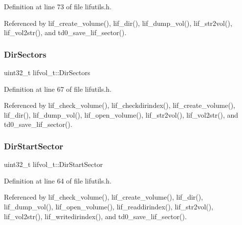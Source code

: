 Definition at line 73 of file lifutils.\+h.



Referenced by lif\+\_\+create\+\_\+volume(), lif\+\_\+dir(), lif\+\_\+dump\+\_\+vol(), lif\+\_\+str2vol(), lif\+\_\+vol2str(), and td0\+\_\+save\+\_\+lif\+\_\+sector().

\mbox{\label{structlifvol__t_aceac3bc67cda1f79d91c002411e33897}} 
\subsubsection{\texorpdfstring{Dir\+Sectors}{DirSectors}}
{\footnotesize\ttfamily uint32\+\_\+t lifvol\+\_\+t\+::\+Dir\+Sectors}



Definition at line 67 of file lifutils.\+h.



Referenced by lif\+\_\+check\+\_\+volume(), lif\+\_\+checkdirindex(), lif\+\_\+create\+\_\+volume(), lif\+\_\+dir(), lif\+\_\+dump\+\_\+vol(), lif\+\_\+open\+\_\+volume(), lif\+\_\+str2vol(), lif\+\_\+vol2str(), and td0\+\_\+save\+\_\+lif\+\_\+sector().

\mbox{\label{structlifvol__t_a89b86c990a7843cfa2addfff9a775137}} 
\subsubsection{\texorpdfstring{Dir\+Start\+Sector}{DirStartSector}}
{\footnotesize\ttfamily uint32\+\_\+t lifvol\+\_\+t\+::\+Dir\+Start\+Sector}



Definition at line 64 of file lifutils.\+h.



Referenced by lif\+\_\+check\+\_\+volume(), lif\+\_\+create\+\_\+volume(), lif\+\_\+dir(), lif\+\_\+dump\+\_\+vol(), lif\+\_\+open\+\_\+volume(), lif\+\_\+readdirindex(), lif\+\_\+str2vol(), lif\+\_\+vol2str(), lif\+\_\+writedirindex(), and td0\+\_\+save\+\_\+lif\+\_\+sector().

\mbox{\label{structlifvol__t_abbccb2f637812a31d24aa1f6725194be}} 
